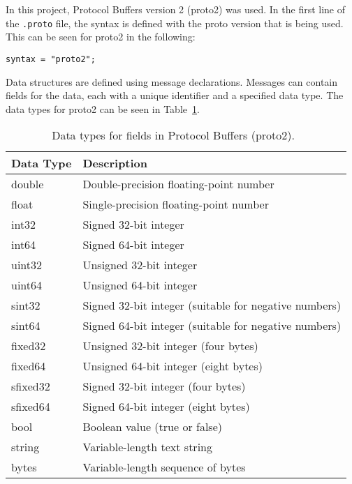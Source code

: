 \documentclass[../MasterThesis.tex]{subfiles}
\begin{document}
In this project, Protocol Buffers version 2 (proto2) was used. In the first line of the \texttt{.proto} file, the syntax is defined with the proto version that is being used. This can be seen for proto2 in the following:

\begin{lstlisting}[style=protobufStyle, numbers=none]
	syntax = "proto2";
\end{lstlisting}

\begin{description}[font=\normalfont\color{RedViolet!80!black}, style=nextline]
	

\item[Messages and Fields] 

Data structures are defined using message declarations. Messages can contain fields for the data, each with a unique identifier and a specified data type. The data types for proto2 can be seen in Table~\ref{table:proto2_data_types}.~\cite{proto2_doc}


\begin{table}[H]
	\centering

	\begin{tabular}{ll}
		\toprule
		\textbf{Data Type} & \textbf{Description} \\
		\midrule
		double & Double-precision floating-point number \\
		float & Single-precision floating-point number \\
		int32 & Signed 32-bit integer \\
		int64 & Signed 64-bit integer \\
		uint32 & Unsigned 32-bit integer \\
		uint64 & Unsigned 64-bit integer \\
		sint32 & Signed 32-bit integer (suitable for negative numbers) \\
		sint64 & Signed 64-bit integer (suitable for negative numbers) \\
		fixed32 & Unsigned 32-bit integer (four bytes) \\
		fixed64 & Unsigned 64-bit integer (eight bytes) \\
		sfixed32 & Signed 32-bit integer (four bytes) \\
		sfixed64 & Signed 64-bit integer (eight bytes) \\
		bool & Boolean value (true or false) \\
		string & Variable-length text string  \\
		bytes & Variable-length sequence of bytes \\
		\bottomrule
	\end{tabular}
	\caption{Data types for fields in Protocol Buffers (proto2).~\cite{proto2_doc}}
	\label{table:proto2_data_types}
\end{table}


\end{description}
\end{document}
